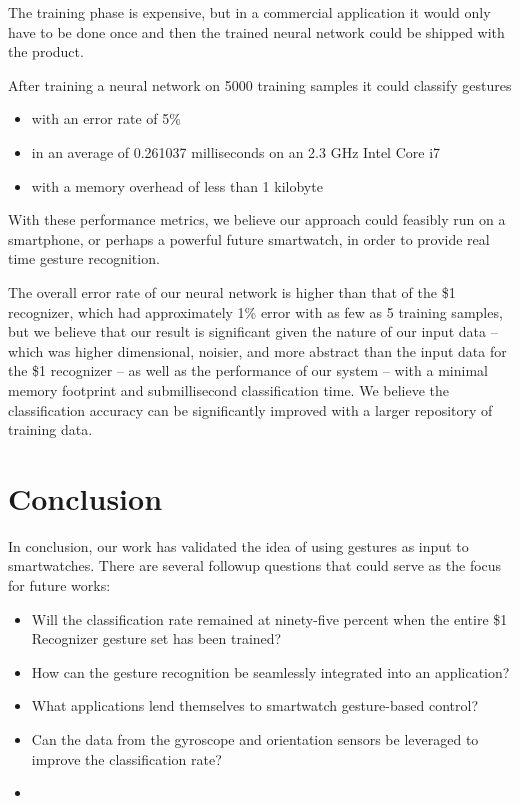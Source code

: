 \documentclass{report}
\begin{document}
The training phase is expensive, but in a commercial application it would only have to be done once and then the trained neural network could be shipped with the product.

After training a neural network on 5000 training samples it could classify gestures
\begin{itemize}
\item with an error rate of 5\%
\item in an average of 0.261037 milliseconds on an 2.3 GHz Intel Core i7
\item with a memory overhead of less than 1 kilobyte
\end{itemize}
With these performance metrics, we believe our approach could feasibly run on a smartphone, or perhaps a powerful future smartwatch, in order to provide real time gesture recognition.

The overall error rate of our neural network is higher than that of the \$1 recognizer, which had approximately 1\% error with as few as 5 training samples, but we believe that our result is significant given the nature of our input data -- which was higher dimensional, noisier, and more abstract than the input data for the \$1 recognizer -- as well as the performance of our system -- with a minimal memory footprint and submillisecond classification time. We believe the classification accuracy can be significantly improved with a larger repository of training data.

\chapter{Conclusion}

In conclusion, our work has validated the idea of using gestures as input to smartwatches. There are several followup questions that could serve as the focus for future works:

\begin{itemize}
\item Will the classification rate remained at ninety-five percent when the entire \$1 Recognizer gesture set has been trained?
\item How can the gesture recognition be seamlessly integrated into an application?
\item What applications lend themselves to smartwatch gesture-based control?
\item Can the data from the gyroscope and orientation sensors be leveraged to improve the classification rate?
\item 
\end{itemize}

\printbibliography
\end{document}
